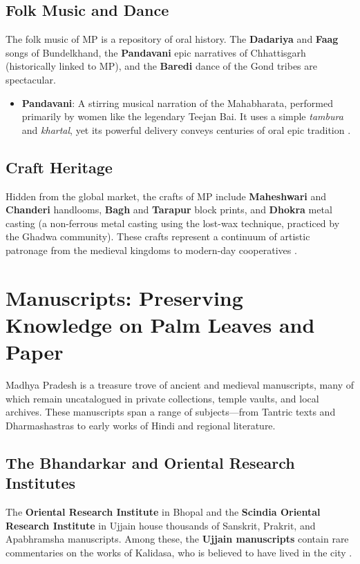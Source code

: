 \documentclass{article}
\begin{document}
\subsection{Folk Music and Dance}
The folk music of MP is a repository of oral history. The \textbf{Dadariya} and \textbf{Faag} songs of Bundelkhand, the \textbf{Pandavani} epic narratives of Chhattisgarh (historically linked to MP), and the \textbf{Baredi} dance of the Gond tribes are spectacular.
\begin{itemize}
    \item \textbf{Pandavani}: A stirring musical narration of the Mahabharata, performed primarily by women like the legendary Teejan Bai. It uses a simple \textit{tambura} and \textit{khartal}, yet its powerful delivery conveys centuries of oral epic tradition \cite{kapadia2005}.
\end{itemize}

\subsection{Craft Heritage}
Hidden from the global market, the crafts of MP include \textbf{Maheshwari} and \textbf{Chanderi} handlooms, \textbf{Bagh} and \textbf{Tarapur} block prints, and \textbf{Dhokra} metal casting (a non-ferrous metal casting using the lost-wax technique, practiced by the Ghadwa community). These crafts represent a continuum of artistic patronage from the medieval kingdoms to modern-day cooperatives \cite{ranjan2007}.

\newpage
\section{Manuscripts: Preserving Knowledge on Palm Leaves and Paper}
Madhya Pradesh is a treasure trove of ancient and medieval manuscripts, many of which remain uncatalogued in private collections, temple vaults, and local archives. These manuscripts span a range of subjects—from Tantric texts and Dharmashastras to early works of Hindi and regional literature.

\subsection{The Bhandarkar and Oriental Research Institutes}
The \textbf{Oriental Research Institute} in Bhopal and the \textbf{Scindia Oriental Research Institute} in Ujjain house thousands of Sanskrit, Prakrit, and Apabhramsha manuscripts. Among these, the \textbf{Ujjain manuscripts} contain rare commentaries on the works of Kalidasa, who is believed to have lived in the city \cite{sori1990}.
\end{document}
